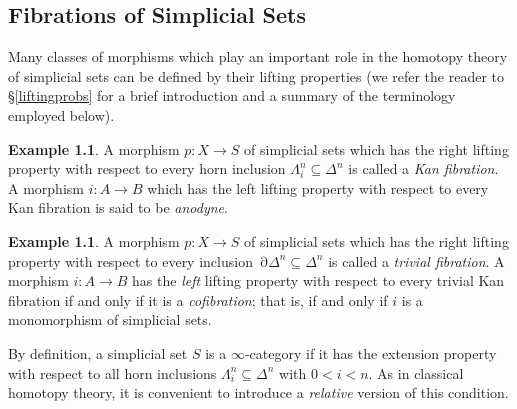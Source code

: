\documentclass{report}[10pt, final]
\DeclareMathOperator{\bd}{\partial}
\theoremstyle{definition}
\newtheorem{example}[theorem]{Example}
\begin{document}



\begin{chapter2onwards}

\chapter{Fibrations of Simplicial Sets}\label{chap2}


\setcounter{theorem}{0}
\setcounter{subsection}{0}


%

 Many classes of morphisms which play an important role in the homotopy theory of simplicial sets can be defined by their lifting properties (we refer the reader to \S \ref{liftingprobs} for a brief introduction and a summary of the terminology employed below). 

\begin{example} 
A morphism $p: X \rightarrow S$ of simplicial sets which has the right
lifting property with respect to every horn inclusion $\Lambda^n_i \subseteq \Delta^n$ is called a {\it Kan fibration}. A morphism $i: A \rightarrow B$ which has the left lifting property with respect to every Kan fibration is said to be {\it anodyne}.
\end{example}

\begin{example}
A morphism $p: X \rightarrow S$ of simplicial sets which has the right
lifting property with respect to every inclusion $\bd \Delta^n \subseteq \Delta^n$ is called a {\it trivial fibration}.
A morphism $i: A \rightarrow B$ has the {\em left} lifting property with respect to every trivial Kan fibration if and only if it is a {\it cofibration}; that is, if and only if $i$ is a monomorphism of simplicial sets.
\end{example}

By definition, a simplicial set $S$ is a $\infty$-category if it has
the extension property with respect to all horn inclusions
$\Lambda^n_i \subseteq \Delta^n$ with $0 < i < n$. As in classical homotopy theory, it is
convenient to introduce a {\em relative} version of this condition.


\end{chapter2onwards}
\end{document}

